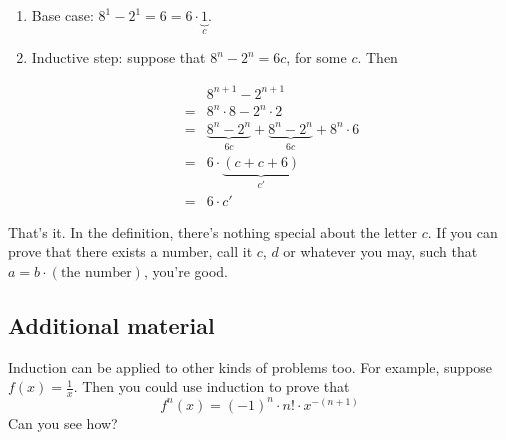 \documentclass{scrreprt}
\begin{document}
\begin{enumerate}
    \item Base case: $8^1 - 2^1 = 6 = 6 \cdot \underbrace{1}_{c}$.
    \item Inductive step: suppose that $8^n - 2^n = 6c$, for some $c$. Then

    \begin{align*}
        & 8^{n + 1} - 2^{n + 1} \\
        =& 8^n \cdot 8 - 2^n \cdot 2 \\
        =& \underbrace{8^n - 2^n}_{6c} + \underbrace{8^n - 2^n}_{6c} + 8^n \cdot 6 \\
        =& 6 \cdot \underbrace{(c + c + 6)}_{c'} \\
        =& 6 \cdot c'
    \end{align*}
    
\end{enumerate}
That's it. In the definition, there's nothing special about the letter $c$. If you can prove that there exists a number, call it $c$, $d$ or whatever you may, such that $a = b \cdot (\text{the number})$, you're good.

\subsection*{Additional material}
Induction can be applied to other kinds of problems too. For example, suppose $f(x) = \frac{1}{x}$. Then you could use induction to prove that $$f^n(x) = (-1)^n \cdot n! \cdot x^{-(n + 1)}$$ Can you see how?
\end{document}
